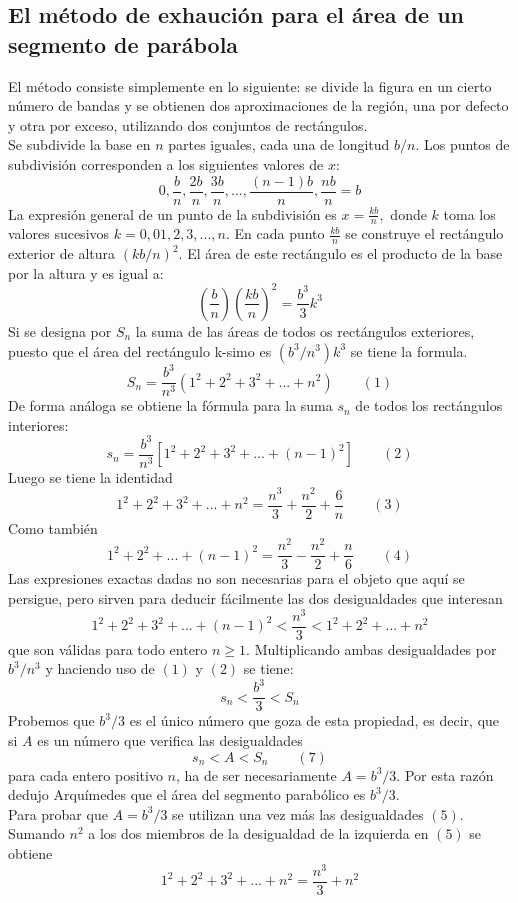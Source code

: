 \begin{multicols}{2}
\section*{El método de exhaución para el área de un segmento de parábola}

El método consiste simplemente en lo siguiente: se divide la figura en un cierto número de bandas y se obtienen dos aproximaciones de la región, una por defecto y otra por exceso, utilizando dos conjuntos de rectángulos.\\
Se subdivide la base en $n$ partes iguales, cada una de longitud $b/n$. Los puntos de subdivisión corresponden a los siguientes valores de $x$: $$0,\dfrac{b}{n},\dfrac{2b}{n},\dfrac{3b}{n},...,\dfrac{(n-1)b}{n},\dfrac{nb}{n}=b$$
La expresión general de un punto de la subdivisión es $x=\frac{kb}{n},$ donde $k$ toma los valores sucesivos $k=0,01,2,3,...,n.$ En cada punto $\frac{kb}{n}$ se construye el rectángulo exterior de altura $(kb/n)^2$. El área de este rectángulo es el producto de la base por la altura y es igual a:
$$\left(\dfrac{b}{n}\right)\left(\dfrac{kb}{n}\right)^2=\dfrac{b^3}{3}k^3$$
Si se designa por $S_n$ la suma de las áreas de todos os rectángulos exteriores, puesto que el área del rectángulo k-simo es $(b^3/n^3)k^3$ se tiene la formula. $$S_n=\dfrac{b^3}{n^3}(1^2+2^2+3^2+...+n^2) \qquad (1)$$
De forma análoga se obtiene la fórmula para la suma $s_n$ de todos los rectángulos interiores:
$$s_n=\dfrac{b^3}{n^3}[1^2+2^2+3^2+...+(n-1)^2] \qquad (2)$$
Luego se tiene la identidad $$1^2+2^2+3^2+...+n^2=\dfrac{n^3}{3}+\dfrac{n^2}{2}+\dfrac{6}{n} \qquad (3)$$
Como también $$1^2+2^2+...+(n-1)^2=\dfrac{n^2}{3}-\dfrac{n^2}{2}+\dfrac{n}{6} \qquad (4)$$
Las expresiones exactas dadas no son necesarias para el objeto que aquí se persigue, pero sirven para deducir fácilmente las dos desigualdades que interesan $$1^2+2^2+3^2+...+(n-1)^2<\dfrac{n^3}{3}<1^2+2^2+...+n^2$$
que son válidas para todo entero $n\geq 1$. Multiplicando ambas desigualdades por $b^3/n^3$ y haciendo uso de $(1)$ y $(2)$ se tiene: $$s_n<\dfrac{b^3}{3}<S_n$$
Probemos que $b^3/3$ es el único número que goza de esta propiedad, es decir, que si $A$ es un número que verifica las desigualdades $$s_n<A<S_n \qquad (7)$$
para cada entero positivo $n$, ha de ser necesariamente $A=b^3/3$. Por esta razón dedujo Arquímedes que el área del segmento parabólico es $b^3/3$.\\
Para probar que $A=b^3/3$ se utilizan una vez más las desigualdades $(5)$. Sumando $n^2$ a los dos miembros de la desigualdad de la izquierda en $(5)$ se obtiene $$1^2+2^2+3^2+...+n^2=\dfrac{n^3}{3}+n^2$$

\end{multicols}
